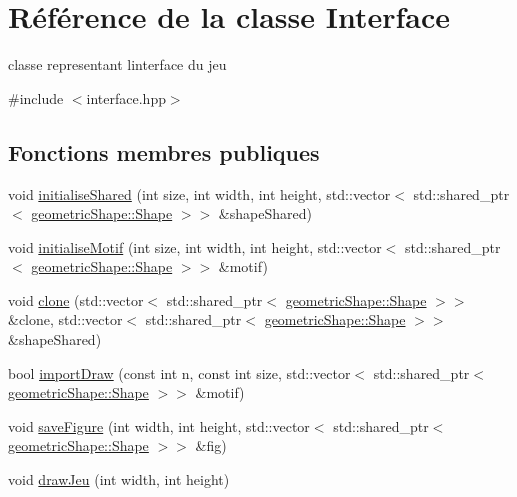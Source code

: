 \hypertarget{class_interface}{}\section{Référence de la classe Interface}
\label{class_interface}


classe representant l\textquotesingle{}interface du jeu  




{\ttfamily \#include $<$interface.\+hpp$>$}

\subsection*{Fonctions membres publiques}
\begin{DoxyCompactItemize}
\item 
void \hyperlink{class_interface_aec83c0f279881d5a0f9739349f4ced5f}{initialise\+Shared} (int size, int width, int height, std\+::vector$<$ std\+::shared\+\_\+ptr$<$ \hyperlink{classgeometric_shape_1_1_shape}{geometric\+Shape\+::\+Shape} $>$$>$ \&shape\+Shared)
\item 
void \hyperlink{class_interface_ac5d7b7903837fc4fb1a51cfd03670cda}{initialise\+Motif} (int size, int width, int height, std\+::vector$<$ std\+::shared\+\_\+ptr$<$ \hyperlink{classgeometric_shape_1_1_shape}{geometric\+Shape\+::\+Shape} $>$$>$ \&motif)
\item 
void \hyperlink{class_interface_a24e7aef887751ec6db3de173edc4e57a}{clone} (std\+::vector$<$ std\+::shared\+\_\+ptr$<$ \hyperlink{classgeometric_shape_1_1_shape}{geometric\+Shape\+::\+Shape} $>$$>$ \&clone, std\+::vector$<$ std\+::shared\+\_\+ptr$<$ \hyperlink{classgeometric_shape_1_1_shape}{geometric\+Shape\+::\+Shape} $>$$>$ \&shape\+Shared)
\item 
bool \hyperlink{class_interface_a38014139b0b4bb26e4099bb05c01a388}{import\+Draw} (const int n, const int size, std\+::vector$<$ std\+::shared\+\_\+ptr$<$ \hyperlink{classgeometric_shape_1_1_shape}{geometric\+Shape\+::\+Shape} $>$$>$ \&motif)
\item 
void \hyperlink{class_interface_adcc750a1e9670363c8d41b6ef33146f3}{save\+Figure} (int width, int height, std\+::vector$<$ std\+::shared\+\_\+ptr$<$ \hyperlink{classgeometric_shape_1_1_shape}{geometric\+Shape\+::\+Shape} $>$$>$ \&fig)
\item 
void \hyperlink{class_interface_a0101527d22a169fb5ad0825b9efc9807}{draw\+Jeu} (int width, int height)
\end{DoxyCompactItemize}


